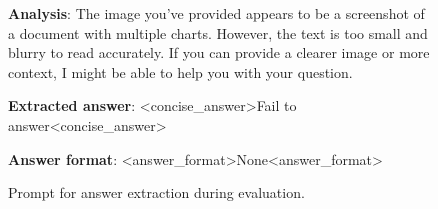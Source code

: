 \begin{figure}[htbp]
\begin{tcolorbox}[title=The answer extracting prompt used to make long response concise during evaluation,colback=gray!5,colframe=gray!75!gray]
{\textbf{Analysis}: The image you’ve provided appears to be a screenshot of a document with multiple charts. However, the text is too small and blurry to read accurately. If you can provide a clearer image or more context, I might be able to help you with your question.

\textbf{Extracted answer}: <concise\_answer>Fail to answer<\/concise\_answer>

\textbf{Answer format}: <answer\_format>None<\/answer\_format>


}
\end{tcolorbox}
\vspace{-0.2cm}
\caption{Prompt for answer extraction during evaluation.}
\label{fig:answer_extraction}
\end{figure}